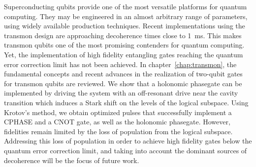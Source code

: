 Superconducting qubits provide one of the most versatile platforms for quantum
computing. They may be engineered in an almost arbitrary range of parameters,
using widely available production techniques. Recent implementations using
the transmon design are approaching decoherence times close to \SI{1}{ms}.
This makes transmon qubits one of the most promising contenders for quantum
computing. Yet, the implementation of high fidelity entangling gates reaching
the quantum error correction limit has not been achieved. In
chapter~\ref{chap:transmon}, the fundamental concepts and recent advances in the
realization of two-qubit gates for transmon qubits are reviewed. We show that
a holonomic phasegate can be implemented by driving the system with an
off-resonant drive near the cavity transition which induces a Stark shift on the
levels of the logical subspace. Using Krotov's method, we obtain optimized
pulses that successfully implement a CPHASE and a CNOT gate, as well as the
holonomic phasegate. However, fidelities remain limited by the loss of
population from the logical subspace. Addressing this loss of population in
order to achieve high fidelity gates below the quantum error correction limit,
and taking into account the dominant sources of decoherence
will be the focus of future work.

